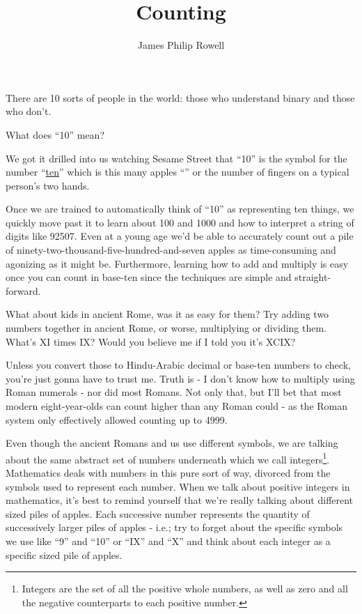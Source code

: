 \documentclass{article}
\title{Counting}
\author{James Philip Rowell}
\begin{document}
\maketitle
\begin{em}
\centerline{\small{}There are 10 sorts of people in the world: those who understand binary and those who don't.}
\end{em}
\bigskip

What does ``10'' mean?

We got it drilled into us watching Sesame Street that ``10'' is the symbol for the number
``\href{https://youtu.be/YcRBEqq-tGY?list=PLjBV4gvZoIcwHfhAWBmP6i7vEuqU6Q6vE}{ten}''
which is this many apples
``\faApple{}\faApple{}\faApple{}\faApple{}\faApple{}\faApple{}\faApple{}\faApple{}\faApple{}\faApple{}''
or the number of fingers on a typical person's two hands.

Once we are trained to automatically think
of ``10'' as representing ten things, we quickly move past it to learn about 100 and 1000
and how to interpret a string of digits 
like 92507. Even at a young age we'd
be able to accurately count out a pile of
ninety-two-thousand-five-hundred-and-seven apples as time-consuming and agonizing as it might be.
Furthermore, learning how to add and multiply is easy once you can count in
base-ten since the techniques are simple and straight-forward.

What about kids in ancient Rome, was it as easy for them?
Try adding two numbers together in ancient Rome, or worse,
multiplying or dividing them.
What's XI times IX? Would you believe me if I told
you it's XCIX?

Unless you convert those to Hindu-Arabic decimal or base-ten numbers to check,
you're just gonna have to trust me.
Truth is - I don't know how to multiply using Roman
numerals - nor did most Romans. Not only that,
but I'll bet that most modern eight-year-olds 
can count higher than any Roman could - as the
Roman system only effectively allowed counting up to 4999.

Even though
the ancient Romans and us
use different symbols, we
are talking about the same abstract set of numbers underneath
which we call integers\footnote{Integers are 
the set of all the positive whole numbers, as well as zero and all the negative counterparts to each positive number.
}.
Mathematics deals with numbers in this pure sort of way, divorced from the symbols
used to represent each number.
When we talk about positive integers in mathematics, it's best to remind yourself
that we're really talking about different sized piles of apples.
Each successive number
represents the quantity of successively larger piles of apples - i.e.; try to forget about the 
specific symbols
we use like ``9'' and ``10'' or ``IX'' and ``X'' and think about each integer as a specific sized pile
of apples.
\end{document}
